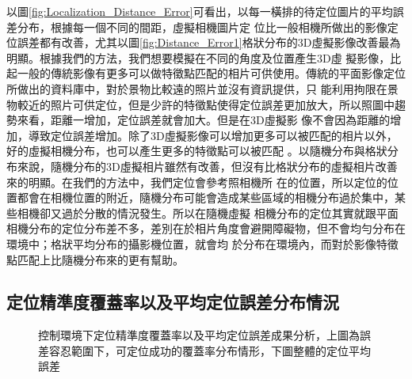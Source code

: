 	以圖\ref{fig:Localization_Distance_Error}可看出，以每一橫排的待定位圖片的平均誤差分布，根據每一個不同的間距，虛擬相機圖片定
位比一般相機所做出的影像定位誤差都有改善，尤其以圖\ref{fig:Distance_Error1}格狀分布的3D虛擬影像改善最為明顯。根據我們的方法，我們想要模擬在不同的角度及位置產生3D虛
擬影像，比起一般的傳統影像有更多可以做特徵點匹配的相片可供使用。傳統的平面影像定位所做出的資料庫中，對於景物比較遠的照片並沒有資訊提供，只
能利用拘限在景物較近的照片可供定位，但是少許的特徵點使得定位誤差更加放大，所以照圖中趨勢來看，距離一增加，定位誤差就會加大。但是在3D虛擬影
像不會因為距離的增加，導致定位誤差增加。除了3D虛擬影像可以增加更多可以被匹配的相片以外，好的虛擬相機分布，也可以產生更多的特徵點可以被匹配
。以隨機分布與格狀分布來說，隨機分布的3D虛擬相片雖然有改善，但沒有比格狀分布的虛擬相片改善來的明顯。在我們的方法中，我們定位會參考照相機所
在的位置，所以定位的位置都會在相機位置的附近，隨機分布可能會造成某些區域的相機分布過於集中，某些相機卻又過於分散的情況發生。所以在隨機虛擬
相機分布的定位其實就跟平面相機分布的定位分布差不多，差別在於相片角度會避開障礙物，但不會均勻分布在環境中；格狀平均分布的攝影機位置，就會均
於分布在環境內，而對於影像特徵點匹配上比隨機分布來的更有幫助。


\subsection{定位精準度覆蓋率以及平均定位誤差分布情況}	
	
\begin{figure}
	\begin{center}
	\end{center}
  \caption{控制環境下定位精準度覆蓋率以及平均定位誤差成果分析，上圖為誤差容忍範圍下，可定位成功的覆蓋率分布情形，下圖整體的定位平均誤差}
  \label{fig:Controlled_EV_Result}	
\end{figure}	

